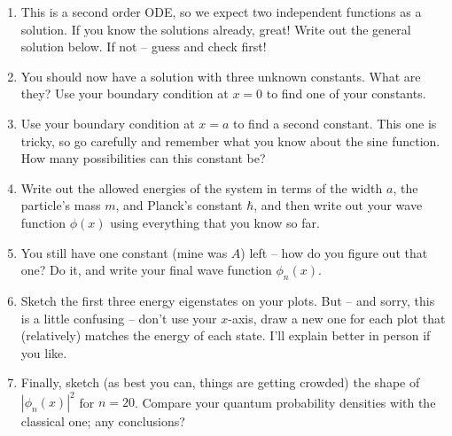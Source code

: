 \documentclass[10pt, letterpaper, twoside, openany]{article}
\begin{document}
\begin{enumerate}
\item This is a second order ODE, so we expect two independent functions as a solution.  If you know the solutions already, great!  Write out the general solution below.  If not -- guess and check first!

\vspace{2in}

\item You should now have a solution with three unknown constants.  What are they?  Use your boundary condition at $x=0$ to find one of your constants.

\vspace{2in}

\item Use your boundary condition at $x=a$ to find a second constant.  This one is tricky, so go carefully and remember what you know about the sine function.  How many possibilities can this constant be?

\newpage

\item Write out the allowed energies of the system in terms of the width $a$, the particle's mass $m$, and Planck's constant $\hbar$, and then write out your wave function $\phi(x)$ using everything that you know so far.

\vspace{2in}

\item You still have one constant (mine was $A$) left -- how do you figure out that one?  Do it, and write your final wave function $\phi_n(x)$.

\vspace{3in}

\item Sketch the first three energy eigenstates on your plots.  But -- and sorry, this is a little confusing -- don't use your $x$-axis, draw a new one for each plot that (relatively) matches the energy of each state.  I'll explain better in person if you like.

\vspace{1in}

\item Finally, sketch (as best you can, things are getting crowded) the shape of $|\phi_n(x)|^2$ for $n=20$.  Compare your quantum probability densities with the classical one; any conclusions?

\end{enumerate}
\end{document}
